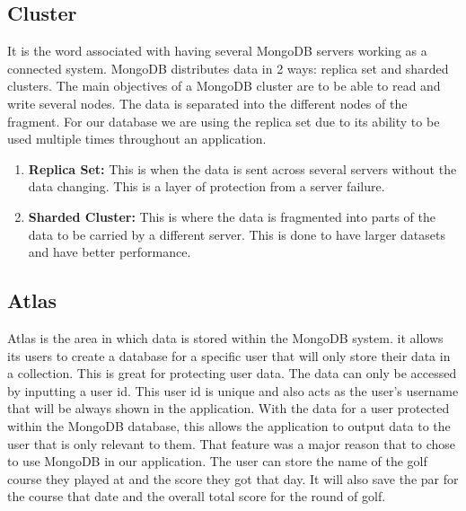 \subsection{Cluster}
It is the word associated with having several MongoDB servers working as a connected system. MongoDB distributes data in 2 ways: replica set and sharded clusters. The main objectives of a MongoDB cluster are to be able to read and write several nodes. The data is separated into the different nodes of the fragment. For our database we are using the replica set due to its ability to be used multiple times throughout an application.\cite{ref4}
 \newpage
\begin{enumerate}
    \item \textbf{Replica Set:}
    \newline This is when the data is sent across several servers without the data changing. This is a layer of protection from a server failure.
    \item \textbf{Sharded Cluster:}
    \newline  This is where the data is fragmented into parts of the data to be carried by a different server. This is done to have larger datasets and have better performance.
\end{enumerate}
\subsection{Atlas}
Atlas is the area in which data is stored within the MongoDB system. it allows its users to create a database for a specific user that will only store their data in a collection. \newline
This is great for protecting user data. The data can only be accessed by inputting a user id. This user id is unique and also acts as the user's username that will be always shown in the application. With the data for a user protected within the MongoDB database, this allows the application to output data to the user that is only relevant to them. That feature was a major reason that to chose to use MongoDB in our application.
\newline
The user can store the name of the golf course they played at and the score they got that day. It will also save the par for the course that date and the overall total score for the round of golf.

